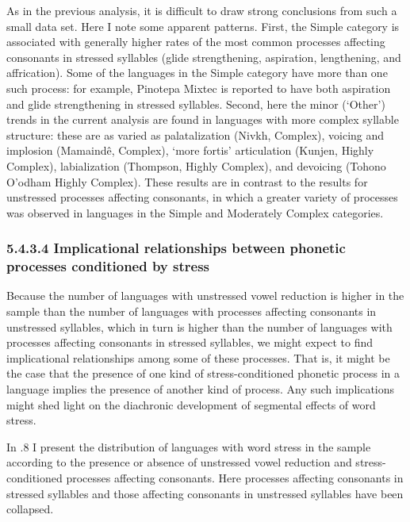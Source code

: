   As in the previous analysis, it is difficult to draw strong conclusions from such a small data set. Here I note some apparent patterns. First, the Simple category is associated with generally higher rates of the most common processes affecting consonants in stressed syllables (glide strengthening, aspiration, lengthening, and affrication). Some of the languages in the Simple category have more than one such process: for example, Pinotepa Mixtec is reported to have both aspiration and glide strengthening in stressed syllables. Second, here the minor (‘Other’) trends in the current analysis are found in languages with more complex syllable structure: these are as varied as palatalization (Nivkh, Complex), voicing and implosion (Mamaindê, Complex), ‘more fortis’ articulation (Kunjen, Highly Complex), labialization (Thompson, Highly Complex), and devoicing (Tohono O’odham Highly Complex). These results are in contrast to the results for unstressed processes affecting consonants, in which a greater variety of processes was observed in languages in the Simple and Moderately Complex categories.


\subsubsection{\textbf{5.4.3.4} \textbf{Implicational} \textbf{relationships} \textbf{between} \textbf{phonetic} \textbf{processes} \textbf{conditioned} \textbf{by} \textbf{stress}}

  Because the number of languages with unstressed vowel reduction is higher in the sample than the number of languages with processes affecting consonants in unstressed syllables, which in turn is higher than the number of languages with processes affecting consonants in stressed syllables, we might expect to find implicational relationships among some of these processes. That is, it might be the case that the presence of one kind of stress-conditioned phonetic process in a language implies the presence of another kind of process. Any such implications might shed light on the diachronic development of segmental effects of word stress.



  In .8 I present the distribution of languages with word stress in the sample according to the presence or absence of unstressed vowel reduction and stress-conditioned processes affecting consonants. Here processes affecting consonants in stressed syllables and those affecting consonants in unstressed syllables have been collapsed.






